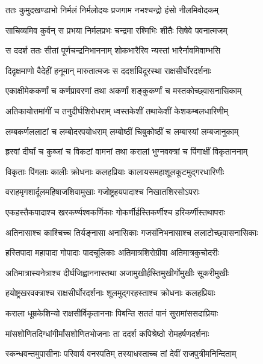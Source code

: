
\twolineshloka
{ततः कुमुदखण्डाभो निर्मलं निर्मलोदयः}
{प्रजगाम नभश्चन्द्रो हंसो नीलमिवोदकम्} %

\twolineshloka
{साचिव्यमिव कुर्वन् स प्रभया निर्मलप्रभः}
{चन्द्रमा रश्मिभिः शीतैः सिषेवे पवनात्मजम्} %

\twolineshloka
{स ददर्श ततः सीतां पूर्णचन्द्रनिभाननाम्}
{शोकभारैरिव न्यस्तां भारैर्नावमिवाम्भसि} %

\twolineshloka
{दिदृक्षमाणो वैदेहीं हनूमान् मारुतात्मजः}
{स ददर्शाविदूरस्था राक्षसीर्घोरदर्शनाः} %

\twolineshloka
{एकाक्षीमेककर्णां च कर्णप्रावरणां तथा}
{अकर्णां शङ्कुकर्णां च मस्तकोच्छ्वासनासिकाम्} %

\twolineshloka
{अतिकायोत्तमांगीं च तनुदीर्घशिरोधराम्}
{ध्वस्तकेशीं तथाकेशीं केशकम्बलधारिणीम्} %

\twolineshloka
{लम्बकर्णललाटां च लम्बोदरपयोधराम्}
{लम्बोष्ठीं चिबुकोष्ठीं च लम्बास्यां लम्बजानुकाम्} %

\twolineshloka
{ह्रस्वां दीर्घां च कुब्जां च विकटां वामनां तथा}
{करालां भुग्नवक्त्रां च पिंगाक्षीं विकृताननाम्} %

\twolineshloka
{विकृताः पिंगलाः कालीः क्रोधनाः कलहप्रियाः}
{कालायसमहाशूलकूटमुद्गरधारिणीः} %

\twolineshloka
{वराहमृगशार्दूलमहिषाजशिवामुखाः}
{गजोष्ट्रहयपादाश्च निखातशिरसोऽपराः} %

\twolineshloka
{एकहस्तैकपादाश्च खरकर्ण्यश्वकर्णिकाः}
{गोकर्णीर्हस्तिकर्णीश्च हरिकर्णीस्तथापराः} %

\twolineshloka
{अतिनासाश्च काश्चिच्च तिर्यङ्नासा अनासिकाः}
{गजसंनिभनासाश्च ललाटोच्छ्वासनासिकाः} %

\twolineshloka
{हस्तिपादा महापादा गोपादाः पादचूलिकाः}
{अतिमात्रशिरोग्रीवा अतिमात्रकुचोदरीः} %

\twolineshloka
{अतिमात्रास्यनेत्राश्च दीर्घजिह्वाननास्तथा}
{अजामुखीर्हस्तिमुखीर्गोमुखीः सूकरीमुखीः} %

\twolineshloka
{हयोष्ट्रखरवक्त्राश्च राक्षसीर्घोरदर्शनाः}
{शूलमुद्गरहस्ताश्च क्रोधनाः कलहप्रियाः} %

\twolineshloka
{कराला धूम्रकेशिन्यो राक्षसीर्विकृताननाः}
{पिबन्ति सततं पानं सुरामांससदाप्रियाः} %

\twolineshloka
{मांसशोणितदिग्धांगीर्मांसशोणितभोजनाः}
{ता ददर्श कपिश्रेष्ठो रोमहर्षणदर्शनाः} %

\twolineshloka
{स्कन्धवन्तमुपासीनाः परिवार्य वनस्पतिम्}
{तस्याधस्ताच्च तां देवीं राजपुत्रीमनिन्दिताम्} %

